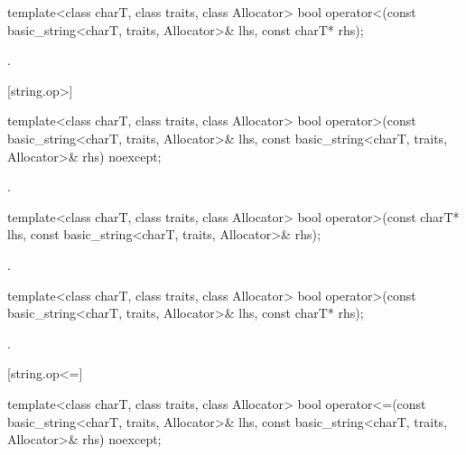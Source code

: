 %
\begin{itemdecl}
template<class charT, class traits, class Allocator>
  bool operator<(const basic_string<charT, traits, Allocator>& lhs, const charT* rhs);
\end{itemdecl}

\begin{itemdescr}
\pnum
\returns
{}.
\end{itemdescr}

[string.op>]{}

%
\begin{itemdecl}
template<class charT, class traits, class Allocator>
  bool operator>(const basic_string<charT, traits, Allocator>& lhs,
                 const basic_string<charT, traits, Allocator>& rhs) noexcept;
\end{itemdecl}

\begin{itemdescr}
\pnum
\returns
{}.
\end{itemdescr}

%
\begin{itemdecl}
template<class charT, class traits, class Allocator>
  bool operator>(const charT* lhs, const basic_string<charT, traits, Allocator>& rhs);
\end{itemdecl}

\begin{itemdescr}
\pnum
\returns
{}.
\end{itemdescr}

%
\begin{itemdecl}
template<class charT, class traits, class Allocator>
  bool operator>(const basic_string<charT, traits, Allocator>& lhs, const charT* rhs);
\end{itemdecl}

\begin{itemdescr}
\pnum
\returns
{}.
\end{itemdescr}

[string.op<=]{}

%
\begin{itemdecl}
template<class charT, class traits, class Allocator>
  bool operator<=(const basic_string<charT, traits, Allocator>& lhs,
                  const basic_string<charT, traits, Allocator>& rhs) noexcept;
\end{itemdecl}

